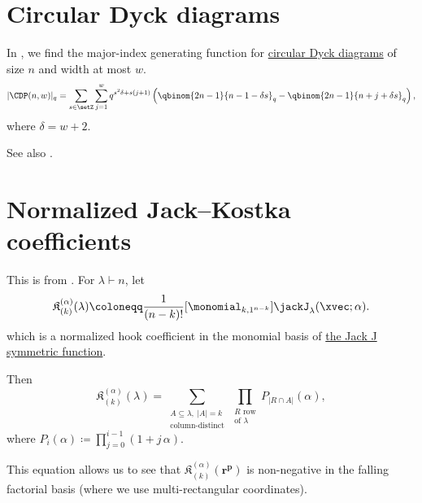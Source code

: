 \section[myEquationsCircularDyck]{Circular Dyck diagrams}

In \cite{AlexanderssonLinussonPotka2019}, we
find the major-index generating function for \hyperref[chromaticQuasisymmetricUnitIntervalGraph]{circular Dyck diagrams}
of size $n$ and width at most $w$.
\begin{equation*}
|\CDP(n,w)|_q =
\sum_{s \in \setZ}
\sum_{j=1}^w
q^{s^2\delta + s(j+1)}
\left(
\qbinom{2n-1}{n-1-\delta s}_q
-
\qbinom{2n-1}{n+j+\delta s}_q
\right),
\end{equation*}
where $\delta = w+2$.

See also .


\section[myEquationsJackKostka]{Normalized Jack--Kostka coefficients}

This is from \cite[Thm. 5.12]{AlexanderssonFeray2017}.
For $\lambda \vdash n$, let
\[
\mathfrak{K}_{(k)}^{(\alpha)}(\lambda) \coloneqq 
\frac{1}{(n-k)!} [\monomial_{k,1^{n-k}}] \jackJ_\lambda(\xvec;\alpha).
\]
which is a normalized hook coefficient in the monomial basis of 
\hyperref[jackJ]{the Jack J symmetric function}.

Then
\[
\mathfrak{K}_{(k)}^{(\alpha)}(\lambda) =  
\sum_{\substack{ A \subseteq \lambda, \ |A|=k \\ \text{column-distinct}}}
\prod_{\substack{R \text{ row} \\ \text{of }\lambda}} P_{|R \cap A|}(\alpha)
,
\]
where  $P_i(\alpha) \coloneqq \prod_{j=0}^{i-1} (1 + j \, \alpha)$.

This equation allows us to see that $\mathfrak{K}_{(k)}^{(\alpha)}(\mathbf{r}^{\mathbf{p}})$
is non-negative in the falling factorial basis (where we use multi-rectangular coordinates).
